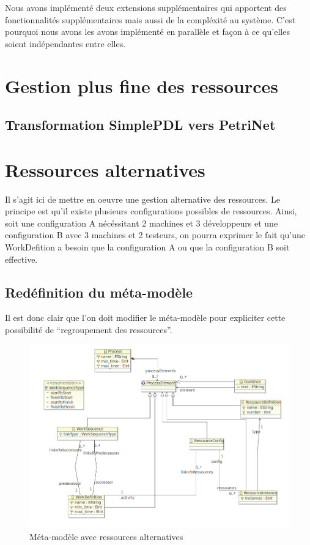 Nous avons implémenté deux extensions supplémentaires qui apportent des fonctionnalités supplémentaires mais aussi de la compléxité au système. C'est pourquoi nous avons les avons implémenté en parallèle et façon à ce qu'elles soient indépendantes entre elles.

\section{Gestion plus fine des ressources}

\subsection{Transformation SimplePDL vers PetriNet}

\section{Ressources alternatives}

Il s'agit ici de mettre en oeuvre une gestion alternative des ressources. Le principe est qu'il existe plusieurs configurations possibles de ressources.
Ainsi, soit une configuration A nécéssitant 2 machines et 3 développeurs et une configuration B avec 3 machines et 2 testeurs, on pourra exprimer le fait qu'une WorkDefition a besoin que la configuration A ou que la configuration B soit effective.

\subsection{Redéfinition du méta-modèle}

Il est donc clair que l'on doit modifier le méta-modèle pour expliciter cette possibilité de ``regroupement des ressources''.

\begin{figure}[!h] 
\begin{center}
\includegraphics[width=15cm]{Capture-13.png}
\caption{Méta-modèle avec ressources alternatives} 
\label{img1} 
\end{center}
\end{figure} 

